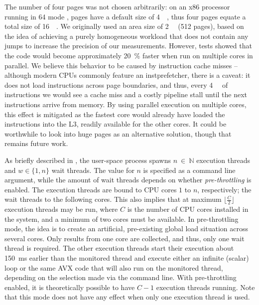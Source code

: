 The number of four pages was not chosen arbitrarily: on an x86 processor running in \SI{64}{\bit} mode \cite{intelsdmsysprogguide}, pages have a default size of \SI{4}{\kibi\byte}, thus four pages equate a total size of \SI{16}{\kibi\byte}. We originally used an area size of \SI{2}{\mebi\byte} (512 pages), based on the idea of achieving a purely homogeneous workload that does not contain any jumps to increase the precision of our measurements. However, tests showed that the code would become approximately \SI{20}{\percent} faster when run on multiple cores in parallel. We believe this behavior to be caused by instruction cache misses -- although modern \glspl{CPU} commonly feature an \gls{instprefetcher}, there is a caveat: it does not load instructions across page boundaries, and thus, every \SI{4}{\kibi\byte} of instructions we would see a cache miss and a costly pipeline stall until the next instructions arrive from memory. By using parallel execution on multiple cores, this effect is mitigated as the fastest core would already have loaded the instructions into the \gls{L3}, readily available for the other cores. It could be worthwhile to look into huge pages as an alternative solution, though that remains future work.

As briefly described in , the user-space process spawns $n~\in~\mathbb{N}$ execution threads and $w\in\{1,n\}$ wait threads. The value for $n$ is specified as a command line argument, while the amount of wait threads depends on whether \textit{pre-throttling} is enabled. The execution threads are bound to \gls{CPU} cores $1$ to $n$, respectively; the wait threads to the following cores. This also implies that at maximum $\lfloor{}\frac{C}{2}\rfloor{}$ execution threads may be run, where $C$ is the number of \gls{CPU} cores installed in the system, and a minimum of two cores must be available. In pre-throttling mode, the idea is to create an artificial, pre-existing global load situation across several cores. Only results from one core are collected, and thus, only one wait thread is required. The other execution threads start their execution about \SI{150}{\milli\second} earlier than the monitored thread and execute either an infinite (scalar) loop or the same \gls{AVX} code that will also run on the monitored thread, depending on the selection made via the command line. With pre-throttling enabled, it is theoretically possible to have $C-1$ execution threads running. Note that this mode does not have any effect when only one execution thread is used.

